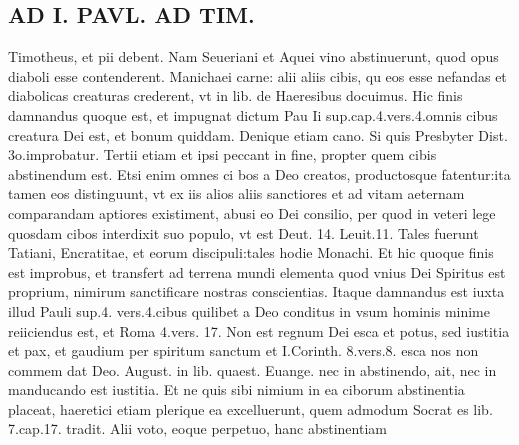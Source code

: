 \documentclass{article}
\begin{document}
\begin{pages}
\section*{AD I. PAVL. AD TIM. }
\marginpar{[ p.374 ]}\pstart Timotheus, et pii debent. Nam Seueriani et Aquei vino abstinuerunt, quod opus diaboli esse contenderent. Manichaei carne: alii aliis cibis, qu eos esse nefandas et diabolicas creaturas crederent, vt in lib.  de Haeresibus docuimus. Hic finis damnandus quoque est, et impugnat dictum Pau Ii sup.cap.4.vers.4.omnis cibus creatura Dei est, et bonum quiddam. Denique etiam cano. Si quis Presbyter Dist. 3o.improbatur. Tertii etiam et ipsi peccant in fine, propter quem cibis abstinendum est. Etsi enim omnes ci bos a Deo creatos, productosque fatentur:ita tamen eos distinguunt, vt ex iis alios aliis sanctiores et ad vitam aeternam comparandam aptiores existiment, abusi eo Dei consilio, per quod in veteri lege quosdam cibos interdixit suo populo, vt est Deut. 14. Leuit.11. Tales fuerunt Tatiani, Encratitae, et eorum discipuli:tales hodie Monachi. Et hic quoque finis est improbus, et transfert ad terrena mundi elementa quod vnius Dei Spiritus est proprium, nimirum sanctificare nostras conscientias. Itaque damnandus est iuxta illud Pauli sup.4. vers.4.cibus quilibet a Deo conditus in vsum hominis minime reiiciendus est, et Roma 4.vers. 17. Non est regnum Dei esca et potus, sed iustitia et pax, et gaudium per spiritum sanctum et I.Corinth. 8.vers.8. esca nos non commem dat Deo. August. in lib.  quaest. Euange. nec in abstinendo, ait, nec in manducando est iustitia. Et ne quis sibi nimium in ea ciborum abstinentia placeat, haeretici etiam plerique ea excelluerunt, quem admodum Socrat es lib. 7.cap.17. tradit. Alii voto, eoque perpetuo, hanc abstinentiam  \pend

\end{pages}
\end{document}

